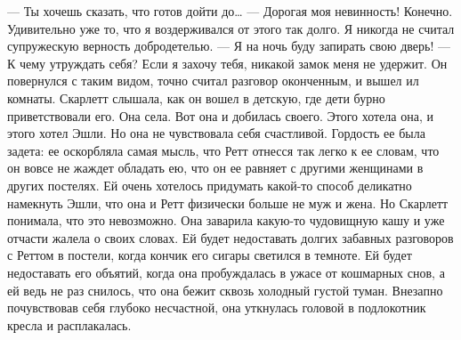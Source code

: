 — Ты хочешь сказать, что готов дойти до…
— Дорогая моя невинность! Конечно. Удивительно уже то, что я воздерживался от этого так долго. Я никогда не считал супружескую верность добродетелью.
— Я на ночь буду запирать свою дверь!
— К чему утруждать себя? Если я захочу тебя, никакой замок меня не удержит.
Он повернулся с таким видом, точно считал разговор оконченным, и вышел ил комнаты. Скарлетт слышала, как он вошел в детскую, где дети бурно приветствовали его. Она села. Вот она и добилась своего. Этого хотела она, и этого хотел Эшли. Но она не чувствовала себя счастливой. Гордость ее была задета: ее оскорбляла самая мысль, что Ретт отнесся так легко к ее словам, что он вовсе не жаждет обладать ею, что он ее равняет с другими женщинами в других постелях.
Ей очень хотелось придумать какой-то способ деликатно намекнуть Эшли, что она и Ретт физически больше не муж и жена. Но Скарлетт понимала, что это невозможно. Она заварила какую-то чудовищную кашу и уже отчасти жалела о своих словах. Ей будет недоставать долгих забавных разговоров с Реттом в постели, когда кончик его сигары светился в темноте. Ей будет недоставать его объятий, когда она пробуждалась в ужасе от кошмарных снов, а ей ведь не раз снилось, что она бежит сквозь холодный густой туман. Внезапно почувствовав себя глубоко несчастной, она уткнулась головой в подлокотник кресла и расплакалась.

